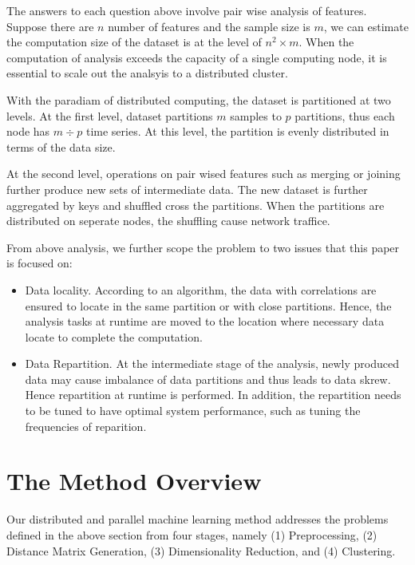 The answers to each question above involve pair wise analysis of features. Suppose there are $n$ number of features and the sample size is $m$, we can estimate the computation size of the dataset is at the level of $n^{2} \times m$. When the computation of analysis exceeds the capacity of a single computing node, it is essential to scale out the analsyis to a distributed cluster. 

With the paradiam of distributed computing, the dataset is partitioned at two levels. At the first level, dataset partitions $m$ samples to $p$ partitions, thus each node has $m \div p$ time series. At this level, the partition is evenly distributed in terms of the data size.

At the second level, operations on pair wised features  such as merging or joining further produce new sets of intermediate data. The new dataset is further aggregated by keys and shuffled cross the partitions. When the partitions are distributed on seperate nodes, the shuffling cause network traffice. 

From above analysis, we further scope the problem to two issues that this paper is focused on: 
\begin{itemize}
	\item Data locality. According to an algorithm, the data with correlations are ensured to locate in the same partition or with close partitions. Hence, the analysis tasks at runtime are moved to the location where necessary data locate to complete the computation. 
	\item Data Repartition. At the intermediate stage of the analysis, newly produced data may cause imbalance of data partitions and thus leads to data skrew. Hence repartition at runtime is performed. In addition, the repartition needs to be tuned to have optimal system performance, such as tuning the frequencies of reparition. 
\end{itemize}


\section{The Method Overview}
Our distributed and parallel machine learning method addresses the problems defined in the above section from four stages, namely (1) Preprocessing, (2) Distance Matrix Generation, (3) Dimensionality Reduction, and (4) Clustering. 

